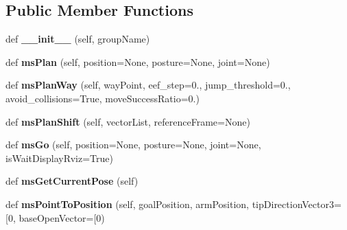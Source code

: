 \subsection*{Public Member Functions}
\begin{DoxyCompactItemize}
\item 
def {\bfseries \+\_\+\+\_\+init\+\_\+\+\_\+} (self, group\+Name)\hypertarget{classmsMoveGroupOld_1_1msMoveGroup_a98f3734be3cec4cbd132720b760adb93}{}\label{classmsMoveGroupOld_1_1msMoveGroup_a98f3734be3cec4cbd132720b760adb93}

\item 
def {\bfseries ms\+Plan} (self, position=None, posture=None, joint=None)\hypertarget{classmsMoveGroupOld_1_1msMoveGroup_a60fa838ffe63915bba5284bbb49f87b0}{}\label{classmsMoveGroupOld_1_1msMoveGroup_a60fa838ffe63915bba5284bbb49f87b0}

\item 
def {\bfseries ms\+Plan\+Way} (self, way\+Point, eef\+\_\+step=0., jump\+\_\+threshold=0., avoid\+\_\+collisions=True, move\+Success\+Ratio=0.)\hypertarget{classmsMoveGroupOld_1_1msMoveGroup_adad133f1851a7bd595e769fc5fab4f6a}{}\label{classmsMoveGroupOld_1_1msMoveGroup_adad133f1851a7bd595e769fc5fab4f6a}

\item 
def {\bfseries ms\+Plan\+Shift} (self, vector\+List, reference\+Frame=None)\hypertarget{classmsMoveGroupOld_1_1msMoveGroup_ae737090ce31f5f2eaaad87920db649ec}{}\label{classmsMoveGroupOld_1_1msMoveGroup_ae737090ce31f5f2eaaad87920db649ec}

\item 
def {\bfseries ms\+Go} (self, position=None, posture=None, joint=None, is\+Wait\+Display\+Rviz=True)\hypertarget{classmsMoveGroupOld_1_1msMoveGroup_a9dbcc45f3641f8025d111f575b794351}{}\label{classmsMoveGroupOld_1_1msMoveGroup_a9dbcc45f3641f8025d111f575b794351}

\item 
def {\bfseries ms\+Get\+Current\+Pose} (self)\hypertarget{classmsMoveGroupOld_1_1msMoveGroup_a2a028894b0afe17eb4c45d1d54de2c02}{}\label{classmsMoveGroupOld_1_1msMoveGroup_a2a028894b0afe17eb4c45d1d54de2c02}

\item 
def {\bfseries ms\+Point\+To\+Position} (self, goal\+Position, arm\+Position, tip\+Direction\+Vector3=\mbox{[}0, base\+Open\+Vector=\mbox{[}0)\hypertarget{classmsMoveGroupOld_1_1msMoveGroup_aab7e2873cebb6612c1a306c4b2977dd2}{}\label{classmsMoveGroupOld_1_1msMoveGroup_aab7e2873cebb6612c1a306c4b2977dd2}


\end{DoxyCompactItemize}
